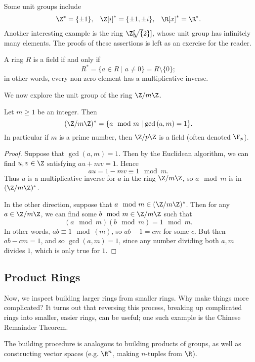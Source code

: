 \documentclass[math1530-lecture-notes]{subfiles}
\begin{document}
\begin{example}
  Some unit groups include
  \begin{align*}
    \Z^*=\{ \pm 1 \}, && \Z[i]^*=\{ \pm 1,\pm i \}, && \R[x]^*=\R^*
  .\end{align*} Another interesting example is the ring $\Z[\sqrt[]{2} ]$, whose unit group has
  infinitely many elements. The proofs of these assertions is left as an exercise for the reader.
\end{example}

\begin{example}
  A ring $R$ is a field if and only if \[
    R^* = \{a\in R\mid a\neq 0\} = R \setminus \{ 0 \}
  ;\] in other words, every non-zero element has a multiplicative inverse.
\end{example}

We now explore the unit group of the ring $\Z / m\Z$.
\begin{proposition}[]{}
  Let $m\ge 1$ be an integer. Then \[
    (\Z / m\Z)^* = \{a\mod{m}\mid \gcd{(a,m)}=1\} 
  .\] In particular if $m$ is a prime number, then $\Z / p\Z$ is a field (often denoted $\F_p$).
\end{proposition}
\begin{proof}[Proof]
  Suppose that $\gcd{(a,m)}=1$. Then by the Euclidean algorithm, we can find $u,v\in \Z$ satisfying
  $au+mv=1$. Hence \[
    au = 1-mv \equiv 1 \mod{m}
  .\] Thus $u$ is a multiplicative inverse for $a$ in the ring $\Z / m\Z$, so $a\mod{m}$ is in $(\Z
  / m\Z)^*$.

  In the other direction, suppose that $a\mod{m}\in (\Z / m\Z)^*$. Then for any $a\in \Z / m\Z$, we
  can find some $b\mod{m}\in \Z / m\Z$ such that \[
    (a\mod{m})(b\mod{m})=1\mod{m}
  .\] In other words, $ab\equiv 1\mod{(m)}$, so $ab-1=cm$ for some $c$. But then $ab-cm=1$, and so
  $\gcd{(a,m)}=1$, since any number dividing both $a,m$ divides $1$, which is only true for $1$.
\end{proof}


\subsection{Product Rings}

Now, we inspect building larger rings from smaller rings. Why make things more complicated? It turns
out that reversing this process, breaking up complicated rings into smaller, easier rings, can be
useful; one such example is the Chinese Remainder Theorem.

The building procedure is analogous to building products of groups, as well as constructing vector
spaces (e.g. $\R^{n}$, making $n$-tuples from $\R$).
\end{document}

